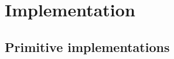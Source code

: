 \chapter{Implementation}\label{sec:implementation}

\section{Primitive  implementations}\label{sec:primitiveEditorableImpl}



